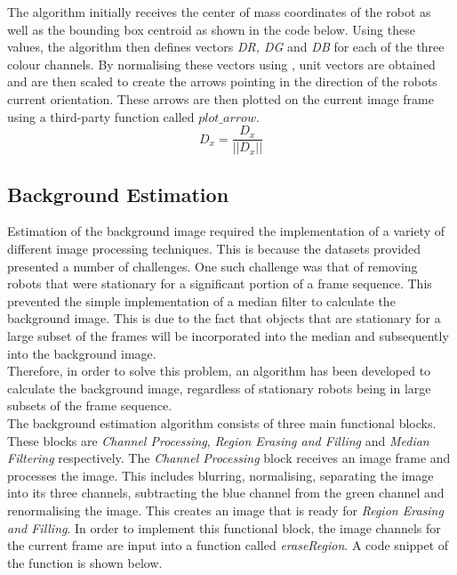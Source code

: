 \documentclass{article}
\begin{document}
The algorithm initially receives the center of mass coordinates of the robot as well as the bounding box centroid as shown in the code below. Using these values, the algorithm then defines vectors \textit{DR, DG} and \textit{DB} for each of the three colour channels. By normalising these vectors using , unit vectors are obtained and are then scaled to create the arrows pointing in the direction of the robots current orientation. These arrows are then plotted on the current image frame using a third-party function called \textit{$plot\_arrow$}.\\

\begin{equation}
D_{x} = \frac{D_{x}}{\vert\vert D_{x} \vert\vert}
\label{eqn:norm}
\end{equation}



\subsection{Background Estimation}
\label{sec:back}
Estimation of the background image required the implementation of a variety of different image processing techniques. This is because the datasets provided presented a number of challenges. One such challenge was that of removing robots that were stationary for a significant portion of a frame sequence. This prevented the simple implementation of a median filter to calculate the background image. This is due to the fact that objects that are stationary for a large subset of the frames will be incorporated into the median and subsequently into the background image.\\

Therefore, in order to solve this problem, an algorithm has been developed to calculate the background image, regardless of stationary robots being in large subsets of the frame sequence. \\

The background estimation algorithm consists of three main functional blocks. These blocks are \textit{Channel Processing}, \textit{Region Erasing and Filling} and \textit{Median Filtering} respectively. The \textit{Channel Processing} block receives an image frame and processes the image. This includes blurring, normalising, separating the image into its three channels, subtracting the blue channel from the green channel and renormalising the image. This creates an image that is ready for \textit{Region Erasing and Filling}. In order to implement this functional block, the image channels for the current frame are input into a function called \textit{eraseRegion}. A code snippet of the function is shown below.\\
\end{document}
